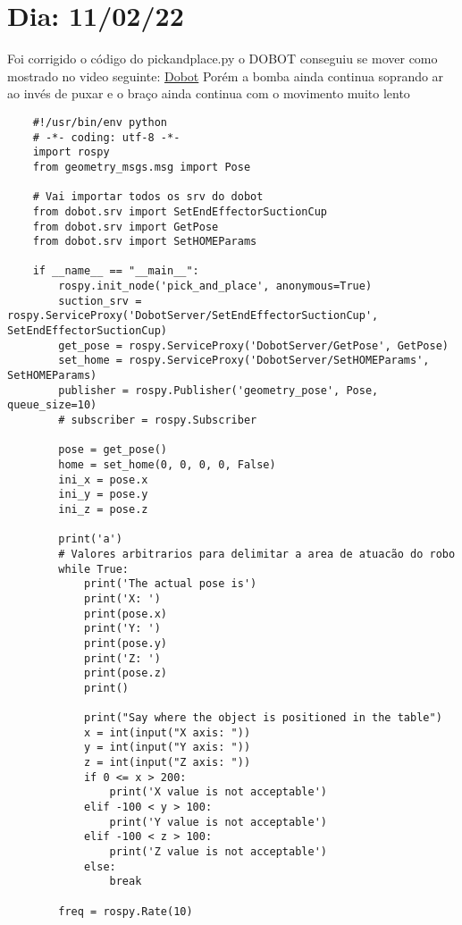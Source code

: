 \chapter{Dia: 11/02/22}
\label{chap:11-02-22}

Foi corrigido o código do pick\underline{\space}and\underline{\space}place.py o DOBOT conseguiu se mover como mostrado no video seguinte: \href{https://youtu.be/nkaut31VhHA}{Dobot} 
Porém a bomba ainda continua soprando ar ao invés de puxar e o braço ainda continua com o movimento muito lento

\begin{lstlisting}
    #!/usr/bin/env python
    # -*- coding: utf-8 -*-
    import rospy
    from geometry_msgs.msg import Pose

    # Vai importar todos os srv do dobot
    from dobot.srv import SetEndEffectorSuctionCup
    from dobot.srv import GetPose
    from dobot.srv import SetHOMEParams

    if __name__ == "__main__":
        rospy.init_node('pick_and_place', anonymous=True)
        suction_srv = rospy.ServiceProxy('DobotServer/SetEndEffectorSuctionCup', SetEndEffectorSuctionCup)
        get_pose = rospy.ServiceProxy('DobotServer/GetPose', GetPose)
        set_home = rospy.ServiceProxy('DobotServer/SetHOMEParams', SetHOMEParams)
        publisher = rospy.Publisher('geometry_pose', Pose, queue_size=10)
        # subscriber = rospy.Subscriber
        
        pose = get_pose()
        home = set_home(0, 0, 0, 0, False)
        ini_x = pose.x
        ini_y = pose.y
        ini_z = pose.z
        
        print('a')
        # Valores arbitrarios para delimitar a area de atuacão do robo
        while True:
            print('The actual pose is')
            print('X: ')
            print(pose.x)
            print('Y: ')
            print(pose.y)
            print('Z: ')
            print(pose.z)
            print()

            print("Say where the object is positioned in the table")
            x = int(input("X axis: "))
            y = int(input("Y axis: "))
            z = int(input("Z axis: "))
            if 0 <= x > 200:
                print('X value is not acceptable')
            elif -100 < y > 100:
                print('Y value is not acceptable')
            elif -100 < z > 100:
                print('Z value is not acceptable')
            else:
                break

        freq = rospy.Rate(10)


\end{lstlisting}
